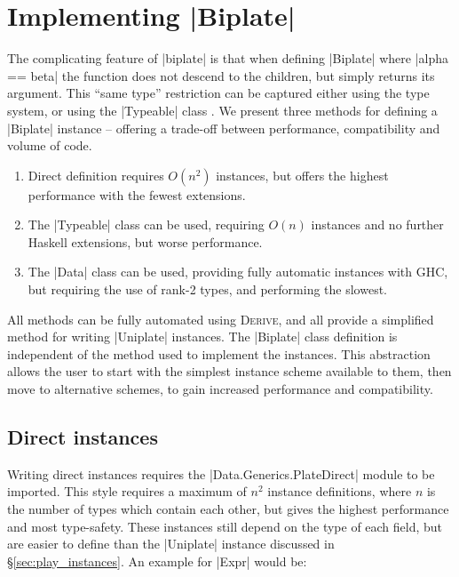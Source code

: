 \documentclass[preprint]{sigplanconf}
\let\cite=\citep
\newenvironment{code}{\begin{alltt}\small}{\end{alltt}}
\newcommand{\derive}{\textsc{Derive}}
\newcommand{\ignore}{}
\begin{document}
\section{Implementing |Biplate|}
\label{sec:implement_playex}

The complicating feature of |biplate| is that when defining |Biplate| where \ignore|alpha == beta| the function does not descend to the children, but simply returns its argument. This ``same type'' restriction can be captured either using the type system, or using the |Typeable| class \cite{lammel:syb}. We present three methods for defining a |Biplate| instance -- offering a trade-off between performance, compatibility and volume of code.

\begin{enumerate}
\item Direct definition requires $O(n^2)$ instances, but offers the highest performance with the fewest extensions.
\item The |Typeable| class can be used, requiring $O(n)$ instances and no further Haskell extensions, but worse performance.
\item The |Data| class can be used, providing fully automatic instances with GHC, but requiring the use of rank-2 types, and performing the slowest.
\end{enumerate}

All methods can be fully automated using \derive{}, and all provide a simplified method for writing |Uniplate| instances. The |Biplate| class definition is independent of the method used to implement the instances. This abstraction allows the user to start with the simplest instance scheme available to them, then move to alternative schemes, to gain increased performance and compatibility.

\subsection{Direct instances}
\label{sec:implement_playdirect}

Writing direct instances requires the |Data.Generics.PlateDirect| module to be imported. This style requires a maximum of $n^2$ instance definitions, where $n$ is the number of types which contain each other, but gives the highest performance and most type-safety. These instances still depend on the type of each field, but are easier to define than the |Uniplate| instance discussed in \S\ref{sec:play_instances}. An example for |Expr| would be:

\end{document}
